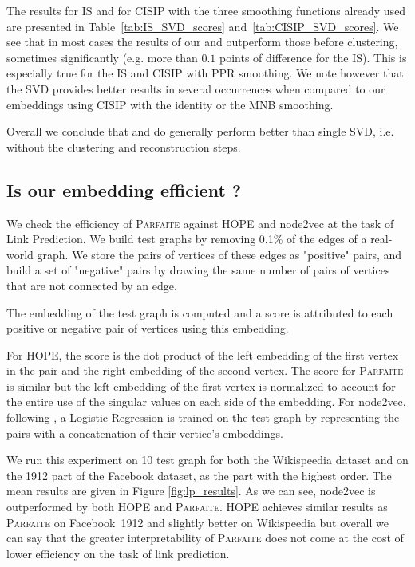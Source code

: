 The results for IS and for CISIP with the three smoothing functions already used are presented in Table~\ref{tab:IS_SVD_scores} and~\ref{tab:CISIP_SVD_scores}. We see that in most cases the results of our \newembLeft and \newembRight outperform those before clustering, sometimes significantly (e.g. more than $0.1$ points of difference for the IS). This is especially true for the IS and CISIP with PPR smoothing. We note however that the SVD provides better results in several occurrences when compared to our embeddings using CISIP with the identity or the MNB smoothing.

Overall we conclude that \newembLeft and \newembRight do generally perform better than single SVD, i.e. without the clustering and reconstruction steps. %

\subsection{Is our embedding efficient ?}

We check the efficiency of \textsc{Parfaite} against HOPE and node2vec at the task of Link Prediction. We build test graphs by removing 0.1\% of the edges of a real-world graph. We store the pairs of vertices of these edges as "positive" pairs, and build a set of "negative" pairs by drawing the same number of pairs of vertices that are not connected by an edge.

The embedding of the test graph is computed and a score is attributed to each positive or negative pair of vertices using this embedding.

For HOPE, the score is the dot product of the left embedding of the first vertex in the pair and the right embedding of the second vertex. The score for \textsc{Parfaite} is similar but the left embedding of the first vertex is normalized to account for the entire use of the singular values on each side of the embedding. For node2vec, following \cite{groverNode2vecScalableFeature2016}, a Logistic Regression is trained on the test graph by representing the pairs with a concatenation of their vertice's embeddings.

We run this experiment on 10 test graph for both the Wikispeedia dataset and on the 1912 part of the Facebook dataset, as the part with the highest order. The mean results are given in Figure \ref{fig:lp_results}. As we can see, node2vec is outperformed by both HOPE and \textsc{Parfaite}. HOPE achieves similar results as \textsc{Parfaite} on Facebook~1912 and slightly better on Wikispeedia but overall we can say that the greater interpretability of \textsc{Parfaite} does not come at the cost of lower efficiency on the task of link prediction.

